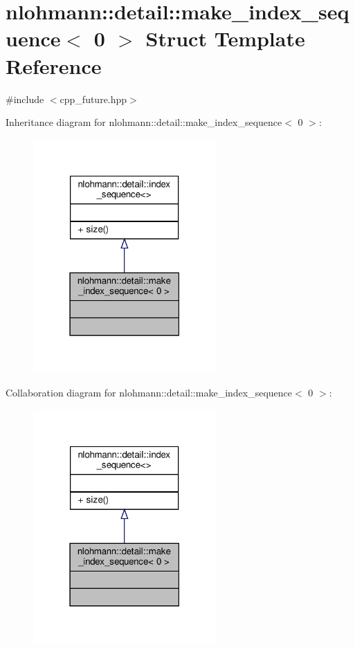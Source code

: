 \hypertarget{structnlohmann_1_1detail_1_1make__index__sequence_3_010_01_4}{}\section{nlohmann\+:\+:detail\+:\+:make\+\_\+index\+\_\+sequence$<$ 0 $>$ Struct Template Reference}
\label{structnlohmann_1_1detail_1_1make__index__sequence_3_010_01_4}


{\ttfamily \#include $<$cpp\+\_\+future.\+hpp$>$}



Inheritance diagram for nlohmann\+:\+:detail\+:\+:make\+\_\+index\+\_\+sequence$<$ 0 $>$\+:
\nopagebreak
\begin{figure}[H]
\begin{center}
\leavevmode
\includegraphics[width=198pt]{structnlohmann_1_1detail_1_1make__index__sequence_3_010_01_4__inherit__graph}
\end{center}
\end{figure}


Collaboration diagram for nlohmann\+:\+:detail\+:\+:make\+\_\+index\+\_\+sequence$<$ 0 $>$\+:
\nopagebreak
\begin{figure}[H]
\begin{center}
\leavevmode
\includegraphics[width=198pt]{structnlohmann_1_1detail_1_1make__index__sequence_3_010_01_4__coll__graph}
\end{center}
\end{figure}
